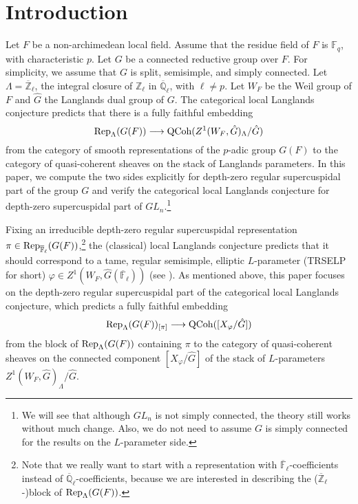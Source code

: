\chapter{Introduction}

Let $F$ be a non-archimedean local field. Assume that the residue field of $F$ is $\mathbb{F}_q$, with characteristic $p$. Let $G$ be a connected reductive group over $F$. For simplicity, we assume that $G$ is split, semisimple, and simply connected. Let $\Lambda=\overline{\mathbb{Z}}_{\ell}$, the integral closure of $\mathbb{Z}_{\ell}$ in $\overline{\mathbb{Q}}_{\ell}$, with $\ell \neq p$. Let $W_F$ be the Weil group of $F$ and $\hat{G}$ the Langlands dual group of $G$. The categorical local Langlands conjecture predicts that there is a fully faithful embedding
$$\operatorname{\operatorname{Rep}}_{\Lambda}(G(F)) \longrightarrow \operatorname{\operatorname{QCoh}}(Z^1(W_F, \hat{G})_{\Lambda}/\hat{G})$$
from the category of smooth representations of the $p$-adic group $G(F)$ to the category of quasi-coherent sheaves on the stack of Langlands parameters. In this paper, we compute the two sides explicitly for depth-zero regular supercuspidal part of the group $G$ and verify the categorical local Langlands conjecture for depth-zero supercuspidal part of $GL_n$.\footnote{We will see that although $GL_n$ is not simply connected, the theory still works without much change. Also, we do not need to assume $G$ is simply connected for the results on the $L$-parameter side.}

Fixing an irreducible depth-zero regular supercuspidal representation $\pi \in \operatorname{\operatorname{Rep}}_{\overline{\mathbb{F}}_{\ell}}(G(F))$,\footnote{Note that we really want to start with a representation with $\overline{\mathbb{F}}_{\ell}$-coefficients instead of $\overline{\mathbb{Q}}_{\ell}$-coefficients, because we are interested in describing the ($\overline{\mathbb{Z}}_{\ell}$-)block of 
$\operatorname{\operatorname{Rep}}_{\Lambda}(G(F))$.} the (classical) local Langlands conjecture predicts that it should correspond to a tame, regular semisimple, elliptic $L$-parameter (TRSELP for short) $\varphi \in Z^1(W_F, \hat{G}(\overline{\mathbb{F}}_{\ell}))$ (see \cite{debacker2009depth}). As mentioned above, this paper focuses on the depth-zero regular supercuspidal part of the categorical local Langlands conjecture, which predicts a fully faithful embedding
$$\operatorname{\operatorname{Rep}}_{\Lambda}(G(F))_{[\pi]} \longrightarrow \operatorname{\operatorname{QCoh}}([X_{\varphi}/\hat{G}])$$
from the block of $\operatorname{\operatorname{Rep}}_{\Lambda}(G(F))$ containing $\pi$ to the category of quasi-coherent sheaves on the connected component $[X_{\varphi}/\hat{G}]$ of the stack of $L$-parameters $Z^1(W_F, \hat{G})_{\Lambda}/\hat{G}$.

